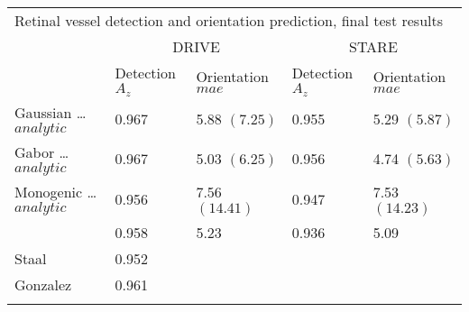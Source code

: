\begin{tabularx}{\linewidth}{X X X X X}

\toprule
\multicolumn{5}{p{\columnwidth}}{ Retinal vessel detection and orientation prediction, final test results} \\
        & \multicolumn{2}{c}{ DRIVE } & \multicolumn{2}{c}{ STARE } \\
\midrule
       & Detection \newline $A_z$ & Orientation \newline $mae$
       & Detection \newline $A_z$ & Orientation \newline $mae$\\
\midrule
Gaussian \newline \ldots $analytic$
        & 0.967    & 5.88 \newline $(7.25)$  & 0.955 & 5.29 \newline $(5.87)$ \\

Gabor \newline \ldots $analytic$
        & 0.967    & 5.03 \newline $(6.25)$ & 0.956 & 4.74 \newline $(5.63)$ \\

Monogenic \newline \ldots $analytic$
        & 0.956    & 7.56 \newline $(14.41)$ & 0.947 & 7.53 \newline $(14.23)$\\

\dtcwt{}  & 0.958    & 5.23 & 0.936 & 5.09 \\



Staal & 0.952    & & & \\

Gonzalez & 0.961    & & & \\

\bottomrule
\noalign{\smallskip}
\end{tabularx}